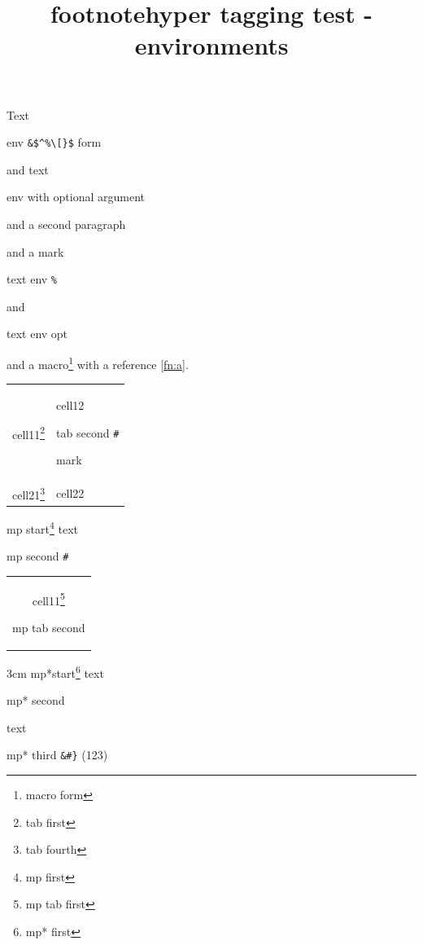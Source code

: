 \documentclass{article}
\title{footnotehyper tagging test - environments}
\begin{document}
Text\begin{footnote}env \verb|&$^%\[}$| form\end{footnote} and
text\begin{footnote}[57]env with optional argument

and a second paragraph\end{footnote} and a mark\footnotemark
\begin{footnotetext}text env \verb|%|\label{fn:a}\end{footnotetext}
and \footnotemark[99]\begin{footnotetext}[99]text env opt\end{footnotetext}
and a macro\footnote{macro form} with a reference \ref{fn:a}.

\begin{savenotes}
\begin{tabular}{cp{3cm}}
cell11\footnote{tab first} & cell12\begin{footnote}tab second \verb|#|\end{footnote}
 mark\footnotemark \\
cell21\footnote[12]{tab fourth} & cell22
\end{tabular}
\end{savenotes}

\begin{minipage}{5cm}
mp start\footnote{mp first}
text\begin{footnote}mp second \verb|#|\end{footnote}
\begin{savenotes}
\begin{tabular}{c}
cell11\footnote{mp tab first}\begin{footnote}mp tab second\end{footnote}
\end{tabular}
\end{savenotes}
\end{minipage}

\begin{minipage*}{3cm}%
mp*start\footnote{mp* first} text\begin{footnote}mp* second\end{footnote}
text\begin{footnote}[123]mp* third \verb|&#}| (123)\end{footnote}\par
\end{minipage*}
\end{document}
